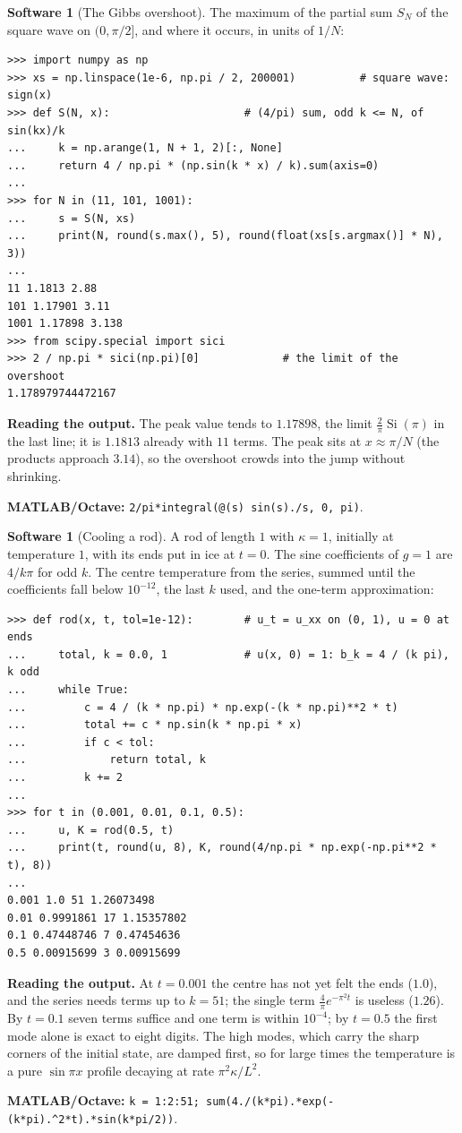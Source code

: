 \documentclass[11pt,a4paper]{article}
\numberwithin{equation}{section}
\theoremstyle{definition}
\newtheorem{software}[thm]{Software}
\begin{document}
\begin{software}[The Gibbs overshoot]
\label{sw:gibbs}
The maximum of the partial sum $S_N$ of the square wave on $(0, \pi/2]$, and where it occurs, in units of $1/N$:
{\small\begin{verbatim}
>>> import numpy as np
>>> xs = np.linspace(1e-6, np.pi / 2, 200001)          # square wave: sign(x)
>>> def S(N, x):                     # (4/pi) sum, odd k <= N, of sin(kx)/k
...     k = np.arange(1, N + 1, 2)[:, None]
...     return 4 / np.pi * (np.sin(k * x) / k).sum(axis=0)
...
>>> for N in (11, 101, 1001):
...     s = S(N, xs)
...     print(N, round(s.max(), 5), round(float(xs[s.argmax()] * N), 3))
...
11 1.1813 2.88
101 1.17901 3.11
1001 1.17898 3.138
>>> from scipy.special import sici
>>> 2 / np.pi * sici(np.pi)[0]             # the limit of the overshoot
1.178979744472167
\end{verbatim}}
\textbf{Reading the output.} The peak value tends to $1.17898$, the limit $\frac2\pi\operatorname{Si}(\pi)$ in the last line; it is $1.1813$ already with $11$ terms. The peak sits at $x \approx \pi/N$ (the products approach $3.14$), so the overshoot crowds into the jump without shrinking.

\textbf{MATLAB/Octave:} \texttt{2/pi*integral(@(s) sin(s)./s, 0, pi)}.
\end{software}

\begin{software}[Cooling a rod]
\label{sw:rod}
A rod of length $1$ with $\kappa = 1$, initially at temperature $1$, with its ends put in ice at $t = 0$. The sine coefficients of $g = 1$ are $4/k\pi$ for odd $k$. The centre temperature from the series, summed until the coefficients fall below $10^{-12}$, the last $k$ used, and the one-term approximation:
{\small\begin{verbatim}
>>> def rod(x, t, tol=1e-12):        # u_t = u_xx on (0, 1), u = 0 at ends
...     total, k = 0.0, 1            # u(x, 0) = 1: b_k = 4 / (k pi), k odd
...     while True:
...         c = 4 / (k * np.pi) * np.exp(-(k * np.pi)**2 * t)
...         total += c * np.sin(k * np.pi * x)
...         if c < tol:
...             return total, k
...         k += 2
...
>>> for t in (0.001, 0.01, 0.1, 0.5):
...     u, K = rod(0.5, t)
...     print(t, round(u, 8), K, round(4/np.pi * np.exp(-np.pi**2 * t), 8))
...
0.001 1.0 51 1.26073498
0.01 0.9991861 17 1.15357802
0.1 0.47448746 7 0.47454636
0.5 0.00915699 3 0.00915699
\end{verbatim}}
\textbf{Reading the output.} At $t = 0.001$ the centre has not yet felt the ends ($1.0$), and the series needs terms up to $k = 51$; the single term $\frac4\pi e^{-\pi^2t}$ is useless ($1.26$). By $t = 0.1$ seven terms suffice and one term is within $10^{-4}$; by $t = 0.5$ the first mode alone is exact to eight digits. The high modes, which
carry the sharp corners of the initial state, are damped first, so for large times the temperature is a pure $\sin\pi x$ profile decaying at rate $\pi^2\kappa/L^2$.

\textbf{MATLAB/Octave:} \texttt{k = 1:2:51; sum(4./(k*pi).*exp(-(k*pi).\^{}2*t).*sin(k*pi/2))}.
\end{software}
\end{document}
